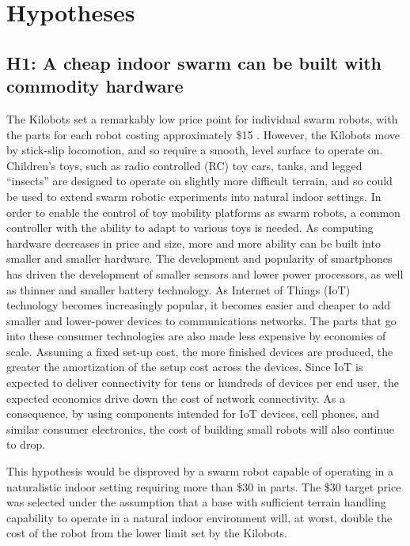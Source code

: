 \section{Hypotheses} \label{section:Hypotheses}

\subsection{H1: A cheap indoor swarm can be built with commodity hardware}

The Kilobots set a remarkably low price point for individual swarm robots, with the parts for each robot costing approximately \$15 \citep{rubenstein2014kilobot}. 
However, the Kilobots move by stick-slip locomotion, and so require a smooth, level surface to operate on. 
Children's toys, such as radio controlled (RC) toy cars, tanks, and legged ``insects'' are designed to operate on slightly more difficult terrain, and so could be used to extend swarm robotic experiments into natural indoor settings. 
In order to enable the control of toy mobility platforms as swarm robots, a common controller with the ability to adapt to various toys is needed.   
As computing hardware decreases in price and size, more and more ability can be built into smaller and smaller hardware. 
The development and popularity of smartphones has driven the development of smaller sensors and lower power processors, as well as thinner and smaller battery technology. 
As Internet of Things (IoT) technology becomes increasingly popular, it becomes easier and cheaper to add smaller and lower-power devices to communications networks. 
The parts that go into these consumer technologies are also made less expensive by economies of scale. 
Assuming a fixed set-up cost, the more finished devices are produced, the greater the amortization of the setup cost across the devices. 
Since IoT is expected to deliver connectivity for tens or hundreds of devices per end user, the expected economics drive down the cost of network connectivity.
As a consequence, by using components intended for IoT devices, cell phones, and similar consumer electronics, the cost of building small robots will also continue to drop.

This hypothesis would be disproved by a swarm robot capable of operating in a naturalistic indoor setting requiring more than \$30 in parts. 
The \$30 target price was selected under the assumption that a base with sufficient terrain handling capability to operate in a natural indoor environment will, at worst, double the cost of the robot from the lower limit set by the Kilobots. 


